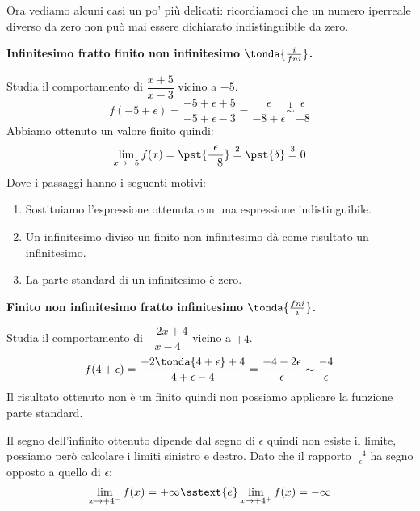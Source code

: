 Ora vediamo alcuni casi un po' più delicati: ricordiamoci che un numero 
iperreale diverso da zero non può mai essere dichiarato indistinguibile 
da zero.

\begin{esempio}
\textbf{Infinitesimo fratto finito non infinitesimo 
\(\tonda{\frac{i}{fni}}\).}

Studia il comportamento di \(\dfrac{x+5}{x-3}\) vicino a \(-5\).
\[
f(-5 + \epsilon) = \frac{-5+\epsilon+5}{-5+\epsilon-3} = 
  \frac{\epsilon}{-8+\epsilon} \stackrel{1}{\sim} 
  \frac{\epsilon}{-8} 
\]
Abbiamo ottenuto un valore finito quindi:
\[
\lim_{x \to -5} f(x) =
  \pst{\frac{\epsilon}{-8}} \stackrel{2}{=} 
  \pst{\delta} \stackrel{3}{=} 0
\]
Dove i passaggi hanno i seguenti motivi:
\begin{enumerate} [nosep]
 \item Sostituiamo l'espressione ottenuta con una espressione 
   indistinguibile.
 \item Un infinitesimo diviso un finito non infinitesimo dà come risultato 
un infinitesimo.
 \item La parte standard di un infinitesimo è zero.
\end{enumerate}
\end{esempio}

\begin{esempio}
\textbf{Finito non infinitesimo fratto infinitesimo 
\(\tonda{\frac{fni}{i}}\).}

Studia il comportamento di \(\dfrac{-2x+4}{x-4}\) vicino a \(+4\).
\[
f(4 +\epsilon) = \frac{-2\tonda{4+\epsilon}+4}{4+\epsilon-4} =
  \frac{-4 - 2 \epsilon}{\epsilon} \sim \frac{-4}{\epsilon} 
\]
Il risultato ottenuto non è un finito quindi non possiamo applicare la 
funzione parte standard.

Il segno dell'infinito ottenuto dipende dal segno di \(\epsilon\) quindi non 
esiste il limite, possiamo però calcolare i limiti sinistro e destro.
Dato che il rapporto \(\frac{-4}{\epsilon}\) ha segno opposto a quello di
\(\epsilon\):
\[
\lim_{x \to +4^-} f(x) = +\infty \sstext{e} 
\lim_{x \to +4^+} f(x) = -\infty
\]
\end{esempio}

